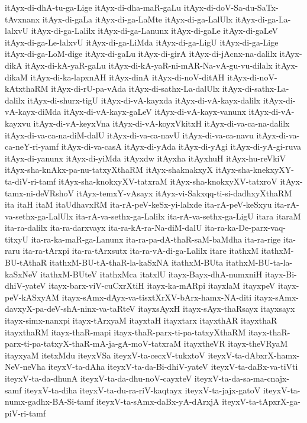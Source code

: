 {itAyx-di-dhA-tu-ga-Lige
itAyx-di-dha-maR-gaLu
itAyx-di-doV-Sa-du-SaTx-tAvxnanx
itAyx-di-gaLa
itAyx-di-ga-LaMte
itAyx-di-ga-LalUlx
itAyx-di-ga-La-lalxvU
itAyx-di-ga-Lalilx
itAyx-di-ga-Lanunx
itAyx-di-gaLe
itAyx-di-gaLeV
itAyx-di-ga-Le-lalxvU
itAyx-di-ga-LiMda
itAyx-di-ga-LigU
itAyx-di-ga-Lige
itAyx-di-ga-LoM-dige
itAyx-di-gaLu
itAyx-di-girA
itAyx-di-jAcnx-na-dalilx
itAyx-dikA
itAyx-di-kA-yaR-gaLu
itAyx-di-kA-yaR-ni-mAR-Na-vA-gu-vu-dilalx
itAyx-dikaM
itAyx-di-ka-lapxnAH
itAyx-dinA
itAyx-di-noV-ditAH
itAyx-di-noV-kAtxthaRM
itAyx-di-rU-pa-vAda
itAyx-di-sathx-La-dalUlx
itAyx-di-sathx-La-dalilx
itAyx-di-shurx-tigU
itAyx-di-vA-kayxda
itAyx-di-vA-kayx-dalilx
itAyx-di-vA-kayx-diMda
itAyx-di-vA-kayx-gaLeV
itAyx-di-vA-kayx-vanunx
itAyx-di-vA-kayxvu
itAyx-di-vA-keyxVna
itAyx-di-vA-koyxVkitxH
itAyx-di-va-ca-na-dalilx
itAyx-di-va-ca-na-diM-dalU
itAyx-di-va-ca-navU
itAyx-di-va-ca-navu
itAyx-di-va-ca-neY-ri-yamf
itAyx-di-va-casA
itAyx-di-yAda
itAyx-di-yAgi
itAyx-di-yA-gi-ruva
itAyx-di-yanunx
itAyx-di-yiMda
itAyxdw
itAyxha
itAyxhuH
itAyx-hu-reVkiV
itAyx-sha-knAkx-pa-nu-tatxyXthaRM
itAyx-shaknakxyX
itAyx-sha-knekxyXY-ta-diV-ri-tamf
itAyx-sha-knokxyXV-tatxraM
itAyx-sha-knokxyXV-tatxroV
itAyx-tamx-ni-deVRshoV
itAyx-temxY-vAsayx
itAyx-vi-Sakxqq-ti-si-dadhxyXthaRM
ita
itaH
itaM
itaUdhavxRM
ita-rA-peV-keSx-yi-lalxde
ita-rA-peV-keSxyu
ita-rA-va-sethx-ga-LalUlx
ita-rA-va-sethx-ga-Lalilx
ita-rA-va-sethx-ga-LigU
itara
itaraM
ita-ra-dalilx
ita-ra-darxvayx
ita-ra-kA-ra-Na-diM-dalU
ita-ra-ka-De-parx-vaq-titxyU
ita-ra-ka-maR-ga-Lanunx
ita-ra-pa-dA-thaR-saM-baMdha
ita-ra-rige
ita-raru
ita-ra-tArxpi
ita-ra-tArxsutx
ita-ra-vA-di-ga-Lalilx
itare
itathxM
itathxM-BU-tAthaR
itathxM-BU-tA-thaR-la-kaSxNA
itathxM-BUta
itathxM-BU-ta-la-kaSxNeV
itathxM-BUteV
itathxMca
itatxlU
itayx-Bayx-dhA-numxniH
itayx-Bi-dhiV-yateV
itayx-barx-viV-cuCxrXtiH
itayx-ka-mARpi
itayxlaM
itayxpeV
itayx-peV-kASxyAM
itayx-sAmx-dAyx-va-tisxtXrXV-bArx-hamx-NA-diti
itayx-sAmx-davxyX-pa-deV-shA-ninx-va-taRteV
itayxsAyxH
itayx-sAyx-thaRsayx
itayxsayx
itayx-simx-nanxpi
itayx-tArxyaM
itayxtaH
itayxtarx
itayxthAR
itayxthaR
itayxthaRM
itayx-thaR-mapi
itayx-thaR-parx-ti-pa-tatxyXthaRM
itayx-thaR-parx-ti-pa-tatxyX-thaR-mA-ja-gA-moV-tatxraM
itayxtheVR
itayx-theVRyaM
itayxyaM
itetxMdu
iteyxVSa
iteyxV-ta-cecxV-tukxtoV
iteyxV-ta-dAbxrX-hamx-NeV-neVha
iteyxV-ta-dAha
iteyxV-ta-da-Bi-dhiV-yateV
iteyxV-ta-daBx-va-tiVti
iteyxV-ta-da-dhunA
iteyxV-ta-da-dhu-noV-cayxteV
iteyxV-ta-da-sa-ma-cnajx-samf
iteyxV-ta-diha
iteyxV-ta-du-ra-riV-kaqtayx
iteyxV-ta-jajx-gatoV
iteyxV-ta-numx-gadhx-BA-Si-tamf
iteyxV-ta-sAmx-daBx-yA-dArxjA
iteyxV-ta-tApxrX-ga-piV-ri-tamf
}
